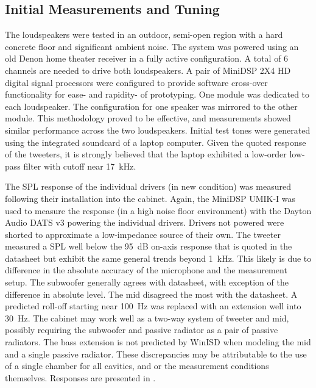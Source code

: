 \subsection{Initial Measurements and Tuning}
The loudspeakers were tested in an outdoor, semi-open region with a hard concrete floor and significant ambient noise. The system was powered using an old Denon home theater receiver in a fully active configuration. A total of 6 channels are needed to drive both loudspeakers. A pair of MiniDSP 2X4 HD digital signal processors were configured to provide software cross-over functionality for ease- and rapidity- of prototyping. One module was dedicated to each loudspeaker. The configuration for one speaker was mirrored to the other module. This methodology proved to be effective, and measurements showed similar performance across the two loudspeakers. Initial test tones were generated using the integrated soundcard of a laptop computer. Given the quoted response of the tweeters, it is strongly believed that the laptop exhibited a low-order low-pass filter with cutoff near \SI{17}{\kilo\hertz}.\par
%
The SPL response of the individual drivers (in new condition) was measured following their installation into the cabinet. Again, the MiniDSP UMIK-I was used to measure the response (in a high noise floor environment) with the Dayton Audio DATS v3 powering the individual drivers. Drivers not powered were shorted to approximate a low-impedance source of their own. The tweeter measured a SPL well below the \SI{95}{\dB} on-axis response that is quoted in the datasheet but exhibit the same general trends beyond \SI{1}{\kilo\hertz}. This likely is due to difference in the absolute accuracy of the microphone and the measurement setup. The subwoofer generally agrees with datasheet, with exception of the difference in absolute level. The mid disagreed the most with the datasheet. A predicted roll-off starting near \SI{100}{\hertz} was replaced with an extension well into \SI{30}{\hertz}. The cabinet may work well as a two-way system of tweeter and mid, possibly requiring the subwoofer and passive radiator as a pair of passive radiators. The bass extension is not predicted by WinISD when modeling the mid and a single passive radiator. These discrepancies may be attributable to the use of a single chamber for all cavities, and or the measurement conditions themselves. Responses are presented in .\par
%
